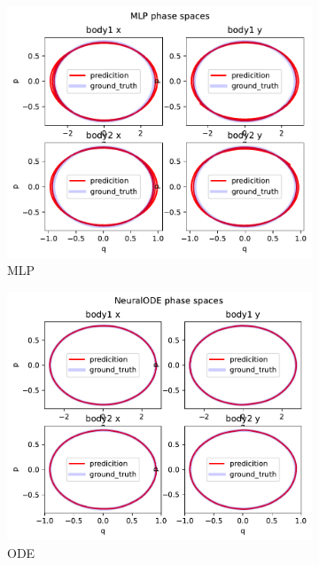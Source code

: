 \begin{figure}[H]
	\centering
	\begin{subfigure}[b]{0.3\textwidth}
		\centering
		\includegraphics[width=\textwidth]{chapters/chapter5/body2_mlp_ps.pdf}
		\caption{MLP}
	\end{subfigure}
	\hfill
	\begin{subfigure}[b]{0.3\textwidth}
		\centering
		\includegraphics[width=\textwidth]{chapters/chapter5/body2_ode_ps.pdf}
		\caption{ODE}
	\end{subfigure}
	\hfill
	\begin{subfigure}[b]{0.3\textwidth}

\end{subfigure}
\end{figure}
